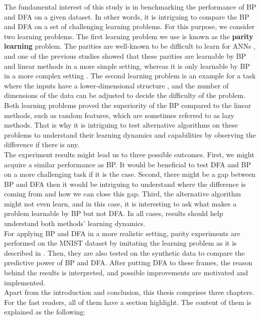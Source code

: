 \documentclass[a4paper, nobind]{templates/ociamthesis}
\begin{document}
The fundamental interest of this study is in benchmarking the performance of BP and DFA on a given dataset. In other words, it is intriguing to compare the BP and DFA on a set of challenging learning problems. For this purpose, we consider two learning problems. The first learning problem we use is known as the \textbf{parity learning} problem. The parities are well-known to be difficult to learn for ANNs \cite{DBLP:journals/corr/abs-1807-06399}, and one of the previous studies showed that these parities are learnable by BP and linear methods in a more simple setting, whereas it is only learnable by BP in a more complex setting \cite{DBLP:journals/corr/abs-2002-07400}. The second learning problem is an example for a task where the inputs have a lower-dimensional structure \cite{chizat2020implicit}, and the number of dimensions of the data can be adjusted to decide the difficulty of the problem. Both learning problems proved the superiority of the BP compared to the linear methods, such as random features, which are sometimes referred to as lazy methods. That is why it is intriguing to test alternative algorithms on these problems to understand their learning dynamics and capabilities by observing the difference if there is any.\\
The experiment results might lead us to three possible outcomes. First, we might acquire a similar performance as BP. It would be beneficial to test DFA and BP on a more challenging task if it is the case. Second, there might be a gap between BP and DFA then it would be intriguing to understand where the difference is coming from and how we can close this gap. Third, the alternative algorithm might not even learn, and in this case, it is interesting to ask what makes a problem learnable by BP but not DFA. In all cases, results should help understand both methods' learning dynamics.\\
For applying BP and DFA in a more realistic setting, parity experiments are performed on the MNIST dataset by imitating the learning problem as it is described in \cite{DBLP:journals/corr/abs-2002-07400}. Then, they are also tested on the synthetic data \cite{chizat2020implicit} to compare the predictive power of BP and DFA. After putting DFA to these frames, the reason behind the results is interpreted, and possible improvements are motivated and implemented.\\
Apart from the introduction and conclusion, this thesis comprises three chapters. For the fast readers, all of them have a section highlight. The content of them is explained as the following:\\
\end{document}
